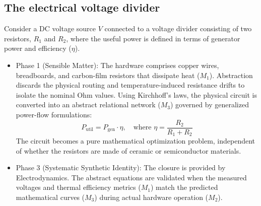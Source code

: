 \documentclass[11pt, a4paper]{article}
\begin{document}
\subsection{The electrical voltage divider}
Consider a DC voltage source $V$ connected to a voltage divider consisting of two resistors, $R_1$ and $R_2$, where the useful power is defined in terms of generator power and efficiency ($\eta$).
\begin{itemize}
\item \textrm{Phase 1 (Sensible Matter):} The hardware comprises copper wires, breadboards, and carbon-film resistors that dissipate heat ($M_1$). Abstraction discards the physical routing and temperature-induced resistance drifts to isolate the nominal Ohm values.
 Using Kirchhoff's laws, the physical circuit is converted into an abstract relational network ($M_3$) governed by generalized power-flow formulations:
\begin{equation}
P_{\text{util}} = P_{\text{gen}} \cdot \eta, \quad \text{where } \eta = \frac{R_2}{R_1 + R_2}
\end{equation}
The circuit becomes a pure mathematical optimization problem, independent of whether the resistors are made of ceramic or semiconductor materials.
\item \textrm{Phase 3 (Systematic Synthetic Identity):} The closure is provided by Electrodynamics. The abstract equations are validated when the measured voltages and thermal efficiency metrics ($M_1$) match the predicted mathematical curves ($M_3$) during actual hardware operation ($M_2$).
\end{itemize}
\end{document}
